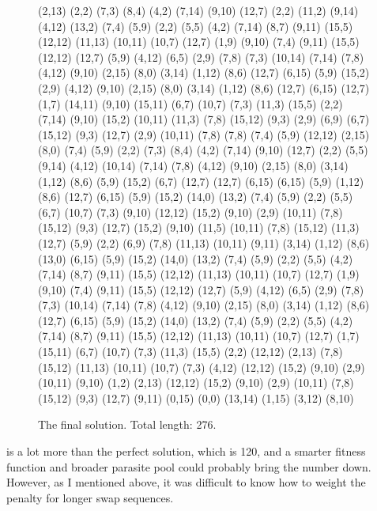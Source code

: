 \documentclass[11pt]{article}
\begin{document}
\begin{figure}[H]
  \begin{adjustwidth}{.5in}{.5in}
    \begin{footnotesize}
      (2,13) (2,2) (7,3) (8,4) (4,2) (7,14) (9,10) (12,7) (2,2) (11,2) (9,14) (4,12) (13,2) (7,4) (5,9) (2,2) (5,5) (4,2) (7,14) (8,7) (9,11) (15,5) (12,12) (11,13) (10,11) (10,7) (12,7) (1,9) (9,10) (7,4) (9,11) (15,5) (12,12) (12,7) (5,9) (4,12) (6,5) (2,9) (7,8) (7,3) (10,14) (7,14) (7,8) (4,12) (9,10) (2,15) (8,0) (3,14) (1,12) (8,6) (12,7) (6,15) (5,9) (15,2) (2,9) (4,12) (9,10) (2,15) (8,0) (3,14) (1,12) (8,6) (12,7) (6,15) (12,7) (1,7) (14,11) (9,10) (15,11) (6,7) (10,7) (7,3) (11,3) (15,5) (2,2) (7,14) (9,10) (15,2) (10,11) (11,3) (7,8) (15,12) (9,3) (2,9) (6,9) (6,7) (15,12) (9,3) (12,7) (2,9) (10,11) (7,8) (7,8) (7,4) (5,9) (12,12) (2,15) (8,0) (7,4) (5,9) (2,2) (7,3) (8,4) (4,2) (7,14) (9,10) (12,7) (2,2) (5,5) (9,14) (4,12) (10,14) (7,14) (7,8) (4,12) (9,10) (2,15) (8,0) (3,14) (1,12) (8,6) (5,9) (15,2) (6,7) (12,7) (12,7) (6,15) (6,15) (5,9) (1,12) (8,6) (12,7) (6,15) (5,9) (15,2) (14,0) (13,2) (7,4) (5,9) (2,2) (5,5) (6,7) (10,7) (7,3) (9,10) (12,12) (15,2) (9,10) (2,9) (10,11) (7,8) (15,12) (9,3) (12,7) (15,2) (9,10) (11,5) (10,11) (7,8) (15,12) (11,3) (12,7) (5,9) (2,2) (6,9) (7,8) (11,13) (10,11) (9,11) (3,14) (1,12) (8,6) (13,0) (6,15) (5,9) (15,2) (14,0) (13,2) (7,4) (5,9) (2,2) (5,5) (4,2) (7,14) (8,7) (9,11) (15,5) (12,12) (11,13) (10,11) (10,7) (12,7) (1,9) (9,10) (7,4) (9,11) (15,5) (12,12) (12,7) (5,9) (4,12) (6,5) (2,9) (7,8) (7,3) (10,14) (7,14) (7,8) (4,12) (9,10) (2,15) (8,0) (3,14) (1,12) (8,6) (12,7) (6,15) (5,9) (15,2) (14,0) (13,2) (7,4) (5,9) (2,2) (5,5) (4,2) (7,14) (8,7) (9,11) (15,5) (12,12) (11,13) (10,11) (10,7) (12,7) (1,7) (15,11) (6,7) (10,7) (7,3) (11,3) (15,5) (2,2) (12,12) (2,13) (7,8) (15,12) (11,13) (10,11) (10,7) (7,3) (4,12) (12,12) (15,2) (9,10) (2,9) (10,11) (9,10) (1,2) (2,13) (12,12) (15,2) (9,10) (2,9) (10,11) (7,8) (15,12) (9,3) (12,7) (9,11) (0,15) (0,0) (13,14) (1,15) (3,12) (8,10)
    \end{footnotesize}
  \end{adjustwidth}
  \caption{The final solution. Total length: 276.}
\end{figure}

 is a lot more than the perfect solution, which is 120, and a smarter fitness function and broader parasite pool could probably bring the number down. However, as I mentioned above, it was difficult to know how to weight the penalty for longer swap sequences.
\end{document}
